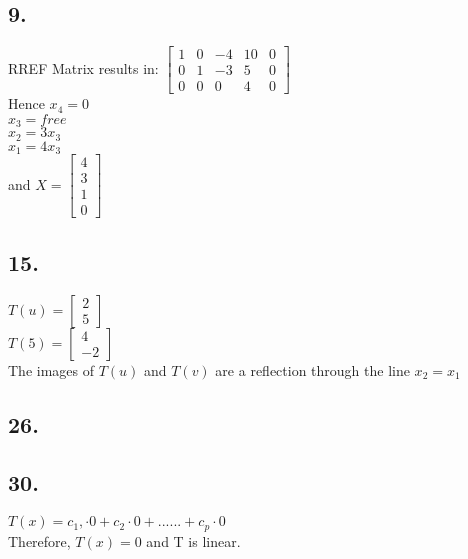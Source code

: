 \documentclass[12]{scrartcl}
\begin{document}
\subsection*{9.}
RREF Matrix results in:
$\begin{bmatrix} 1&0&-4&10&0 \\0&1&-3&5&0 \\ 0&0&0&4&0  \end{bmatrix}$\\
Hence $x_4 = 0$\\
$x_3 = free$\\
$x_2 = 3x_3$\\
$x_1 = 4x_3$\\
and $ X = \begin{bmatrix} 4 \\3 \\ 1 \\ 0 \end{bmatrix}$\\
\subsection*{15.}
$ T(u) = \begin{bmatrix} 2  \\ 5  \end{bmatrix}$\\
$ T(5) = \begin{bmatrix} 4  \\ -2  \end{bmatrix}$\\
The images of $T(u)$ and $ T(v)$ are a reflection through the line $x_2 = x_1$
\subsection*{26.}

\subsection*{30.}
$T(x) = c_1, \cdot 0 + c_2 \cdot 0 + ...... + c_p \cdot 0$\\
Therefore, $T(x) = 0$ and T is linear. 
\end{document}
